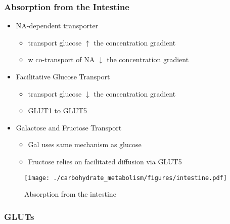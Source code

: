 \documentclass{scrartcl}
\begin{document}
\subsubsection{Absorption from the Intestine}
\label{sec:orgd03984d}
\begin{itemize}
\item NA-dependent transporter
\begin{itemize}
\item transport glucose \(\uparrow\) the concentration gradient
\item w co-transport of NA \(\downarrow\) the concentration gradient
\end{itemize}
\item Facilitative Glucose Transport
\begin{itemize}
\item transport glucose \(\downarrow\) the concentration gradient
\item GLUT1 to GLUT5
\end{itemize}
\item Galactose and Fructose Transport
\begin{itemize}
\item Gal uses same mechanism as glucose
\item Fructose relies on facilitated diffusion via GLUT5
\end{itemize}
\end{itemize}

\begin{figure}[htbp]
\centering
\texttt{[image: ./carbohydrate\_metabolism/figures/intestine.pdf]}
\caption{\label{fig:org5c85aed}
Absorption from the intestine}
\end{figure}

\subsubsection{GLUTs}
\label{sec:orgdb8df2a}
\end{document}
